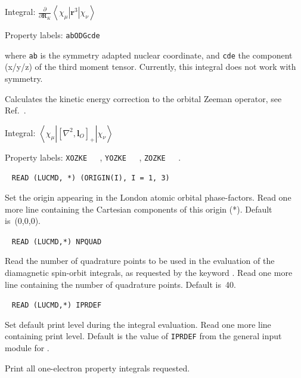 \begin{description}
\begin{list}{}{}
\item Integral: $\frac{\partial}{\partial {\mathbf
R}_K}\left<\chi_{\mu}\left|{\mathbf r}^3\right|\chi_{\nu}\right>$ 
\item Property labels: \verb|abODGcde|
\end{list}
where \verb|ab| is the symmetry adapted nuclear coordinate, and \verb|cde| the
component (x/y/z) of the third moment tensor. Currently, this integral
does not work with symmetry.

\item[\Key{OZ-KE}] Calculates the kinetic energy correction to the
  orbital Zeeman operator, see Ref.~\cite{pmpljvkrjcp119}.

\begin{list}{}{}
\item Integral: $\left<\chi_{\mu}\left|\left[\nabla^2,{\mathbf
    l}_O\right]_+\right|\chi_{\nu}\right>$  
\item Property labels: \verb|XOZKE   |, \verb|YOZKE   |, \verb|ZOZKE   |.
\end{list}

\item[\Key{PHASEO}]\verb| |\newline
\verb|READ (LUCMD, *) (ORIGIN(I), I = 1, 3)|

Set the origin appearing in the London atomic orbital phase-factors.
Read one more line containing the Cartesian components of this origin (*).
Default is~(0,0,0).

\item[\Key{POINTS}]\verb| |\newline
\verb|READ (LUCMD,*) NPQUAD|

Read the number of quadrature points to be
used in the evaluation of
the diamagnetic spin-orbit integrals, as
requested by the keyword
. Read one more line containing the number of quadrature
points. Default is~40.

\item[\Key{PRINT}]\verb| |\newline
\verb|READ (LUCMD,*) IPRDEF|

Set default print level during the integral evaluation.  Read one more line
containing print level. Default is the value of \verb|IPRDEF|
from the general input module for {\dalton}.

\item[\Key{PROPRI}] Print all one-electron property integrals requested.


\end{description}
